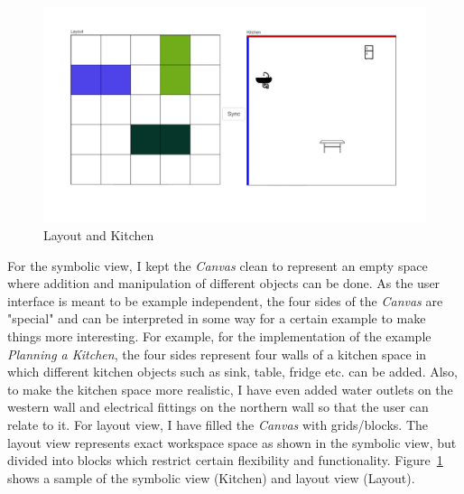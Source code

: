 \begin{figure}[h]
	\centering
	\includegraphics[width=1\textwidth]{figures/Layout_Kitchen}
	\caption{Layout and Kitchen}
	\label{fig:Layout_Kitchen}
\end{figure}

For the symbolic view, I kept the \textit{Canvas} clean to represent an empty space where addition and manipulation of different objects can be done. As the user interface is meant to be example independent, the four sides of the \textit{Canvas} are "special" and can be interpreted in some way for a certain example to make things more interesting. For example, for the implementation of the example \textit{Planning a Kitchen}, the four sides represent four walls of a kitchen space in which different kitchen objects such as sink, table, fridge etc. can be added. Also, to make the kitchen space more realistic, I have even added {\color{blue} water outlets} on the western wall and {\color{red} electrical fittings} on the northern wall so that the user can relate to it. For layout view, I have filled the \textit{Canvas} with grids/blocks. The layout view represents exact workspace space as shown in the symbolic view, but divided into blocks which restrict certain flexibility and functionality. Figure~\ref{fig:Layout_Kitchen} shows a sample of the symbolic view (Kitchen) and layout view (Layout).

